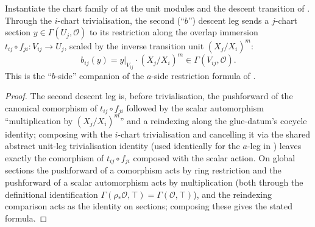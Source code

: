 \begin{lemma}
  \label{lem:serre_twist_b_leg}
  Instantiate the chart family of  at the unit
  modules and the descent transition of . Through the
  \(i\)-chart trivialisation, the second (``\(b\)'') descent leg sends a
  \(j\)-chart section \(y \in \Gamma(U_j, \mathcal O)\) to its restriction
  along the overlap immersion \(t_{ij} \circ f_{ji} : V_{ij} \to U_j\), scaled
  by the inverse transition unit \((X_j/X_i)^m\):
  \[
    b_{ij}(y) = y|_{V_{ij}} \cdot (X_j/X_i)^m \in \Gamma(V_{ij}, \mathcal O).
  \]
  This is the ``\(b\)-side'' companion of the \(a\)-side restriction formula
  of .
\end{lemma}
\begin{proof}\leanok
  The second descent leg is, before trivialisation, the pushforward of the
  canonical comorphism of \(t_{ij} \circ f_{ji}\) followed by the scalar
  automorphism ``multiplication by \((X_j/X_i)^m\)'' and a reindexing along
  the glue-datum's cocycle identity; composing with the \(i\)-chart
  trivialisation and cancelling it via the shared abstract unit-leg
  trivialisation identity (used identically for the \(a\)-leg in
  ) leaves exactly the comorphism of
  \(t_{ij} \circ f_{ji}\) composed with the scalar action. On global
  sections the pushforward of a comorphism acts by ring restriction and the
  pushforward of a scalar automorphism acts by multiplication (both
  through the definitional identification \(\Gamma(\rho_* \mathcal O, \top) =
  \Gamma(\mathcal O, \top)\)), and the reindexing comparison acts as the
  identity on sections; composing these gives the stated formula.
\end{proof}

